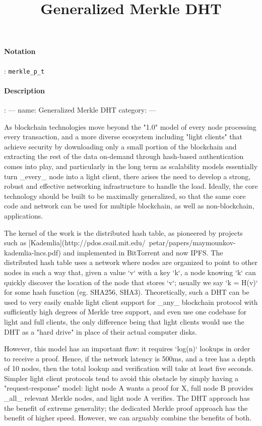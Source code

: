 \documentclass[10pt,a4paper,oneside]{scrartcl}
\author{}
\title{Generalized Merkle DHT}
\date{}
\begin{document}
\maketitle
\paragraph{Notation}: \texttt{merkle\_p\_t} 
\paragraph{Description}: 
---
name: Generalized Merkle DHT
category: 
---

As blockchain technologies move beyond the "1.0" model of every node processing every transaction, and a more diverse ecosystem including "light clients" that achieve security by downloading only a small portion of the blockchain and extracting the rest of the data on-demand through hash-based authentication comes into play, and particularly in the long term as scalability models essentially turn _every_ node into a light client, there arises the need to develop a strong, robust and effective networking infrastructure to handle the load. Ideally, the core technology should be built to be maximally generalized, so that the same core code and network can be used for multiple blockchain, as well as non-blockchain, applications.

The kernel of the work is the distributed hash table, as pioneered by projects such as [Kademlia](http://pdos.csail.mit.edu/~petar/papers/maymounkov-kademlia-lncs.pdf) and implemented in BitTorrent and now IPFS. The distributed hash table uses a network where nodes are organized to point to other nodes in such a way that, given a value `v` with a key `k`, a node knowing `k` can quickly discover the location of the node that stores `v`; usually we say `k = H(v)` for some hash function (eg. SHA256, SHA3). Theoretically, such a DHT can be used to very easily enable light client support for _any_ blockchain protocol with sufficiently high degrees of Merkle tree support, and even use one codebase for light and full clients, the only difference being that light clients would use the DHT as a "hard drive" in place of their actual computer disks.

However, this model has an important flaw: it requires `log(n)` lookups in order to receive a proof. Hence, if the network latency is 500ms, and a tree has a depth of 10 nodes, then the total lookup and verification will take at least five seconds. Simpler light client protocols tend to avoid this obstacle by simply having a "request-response" model: light node A wants a proof for X, full node B provides _all_ relevant Merkle nodes, and light node A verifies. The DHT approach has the benefit of extreme generality; the dedicated Merkle proof approach has the benefit of higher speed. However, we can arguably combine the benefits of both.
\end{document}
